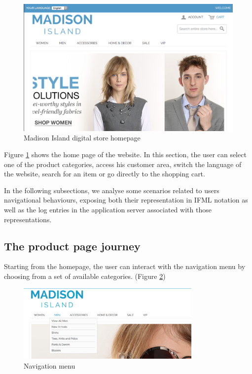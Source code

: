 \vspace{0.5cm}
\begin{figure}[htbp]
  \centering
    \includegraphics[width=12cm]{images/home.png}
  \caption{Madison Island digital store homepage}
  \label{fig:home}
\end{figure}
\vspace{0.5cm}


Figure \ref{fig:home} shows the home page of the website. In this section, the user can select one of the product categories, access his customer area, switch the language of the website, search for an item or go directly to the shopping cart. 

In the following subsections, we analyse some scenarios related to users navigational behaviours, exposing both their representation in IFML notation as well as the log entries in the application server associated with those representations.

\newpage
\subsection{The product page journey}
\label{the-product-page-journey}

Starting from the homepage, the user can interact with the navigation menu by choosing from a set of available categories.  (Figure \ref{fig:navigation})

\vspace{0.5cm}
\begin{figure}[H]
  \centering
    \includegraphics[width=9cm]{images/madison/navigation.png}
  \caption{Navigation menu}
  \label{fig:navigation}
\end{figure}
\vspace{0.5cm}

